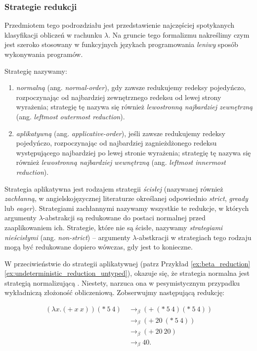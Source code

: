 \subsubsection{Strategie redukcji}\label{subsec:lazy_eval}
Przedmiotem tego podrozdziału jest  przedstawienie najczęściej spotykanych klasyfikacji 
obliczeń w rachunku \(\lambda\). Na gruncie tego formalizmu nakreślimy 
czym jest szeroko stosowany w funkcyjnych językach programowania \emph{leniwy}
sposób wykonywania programów.

\begin{definicja}
Strategię nazywamy:
\begin{enumerate}
  \item \emph{normalną} (ang. \emph{normal-order}), gdy zawsze redukujemy redeksy pojedyńczo, rozpoczynając od najbardziej zewnętrznego redeksu od lewej strony wyrażenia; strategię tę nazywa się również \emph{lewostronną najbardziej zewnętrzną} (ang. \emph{leftmost outermost reduction}).
\item \emph{aplikatywną} (ang. \emph{applicative-order}), jeśli zawsze redukujemy redeksy pojedyńczo, rozpoczynając od najbardziej zagnieżdżonego redeksu występującego najbardziej po lewej stronie wyrażenia; strategię tę nazywa się również \emph{lewostronną najbardziej wewnętrzną} (ang. \emph{leftmost innermost reduction}).

\end{enumerate}
\end{definicja}

Strategia aplikatywna jest rodzajem strategii \emph{ścisłej} (nazywanej również \emph{zachłanną}, w angielskojęzycznej literaturze określanej odpowiednio \emph{strict}, \emph{gready} lub \emph{eager}). Strategiami zachłannymi nazywamy wszystkie te redukcje, w których argumenty \(\lambda\)-abstrakcji są redukowane do postaci normalnej przed zaaplikowaniem ich. Strategie, które nie są ścisłe, nazywamy \emph{strategiami nieścisłymi} (ang. \emph{non-strict}) -- argumenty \(\lambda\)-abstkracji w strategiach tego rodzaju mogą być redukowane dopiero wówczas, gdy jest to konieczne.

W przeciwieństwie do strategii aplikatywnej (patrz Przykład \ref{ex:beta_reduction}\ref{ex:undeterministic_reduction_untyped}), okazuje się, że strategia normalna jest strategią normalizującą \cite[Rozdział 1.5]{Urzyczyn2006}. Niestety, narzuca ona w pesymistycznym przypadku wykładniczą złożoność obliczeniową. Zobserwujmy następującą redukcję:

\begin{align*}
  \left(\lambda x.(+\ x\ x)\right)(*\ 5\ 4)\ &\to_\beta (+\ (*\ 5\ 4)(*\ 5\ 4))\tag{\(\blacktriangledown\)}\label{ex:normal_reduction}\\
  &\to_\beta (+\ 20\ (*\ 5\ 4))\\
  &\to_\beta (+\ 20\ 20)\\
  &\to_\beta 40.
\end{align*}

